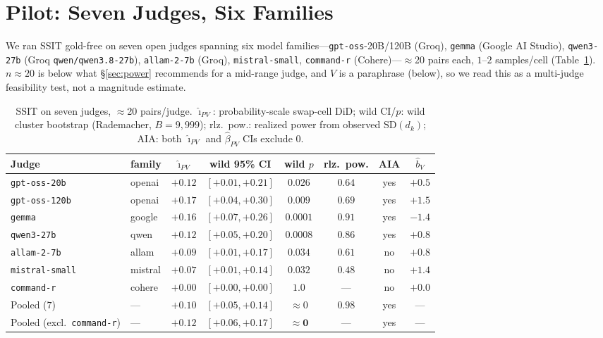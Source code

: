 \documentclass{article}
\begin{document}
\section{Pilot: Seven Judges, Six Families}
\label{sec:results}
\label{sec:pilot}

We ran SSIT gold-free on seven open judges spanning six model
families---\texttt{gpt-oss}-20B/120B (Groq), \texttt{gemma}
(Google AI Studio), \texttt{qwen3-27b} (Groq \texttt{qwen/qwen3.8-27b}),
\texttt{allam-2-7b} (Groq), \texttt{mistral-small}, \texttt{command-r}
(Cohere)---$\approx$20 pairs each, $1$--$2$ samples/cell
(Table~\ref{tab:pilot}). $n{\approx}20$ is below what \S\ref{sec:power}
recommends for a mid-range judge, and $V$ is a paraphrase (below), so
we read this as a multi-judge feasibility test, not a magnitude
estimate.

\begin{table}[htbp]
\centering
\caption{SSIT on seven judges, $\approx$20 pairs/judge.
$\hat\imath_{PV}$: probability-scale swap-cell DiD; wild CI/$p$:
wild cluster bootstrap (Rademacher, $B{=}9{,}999$); rlz.\ pow.:
realized power from observed $\mathrm{SD}(d_k)$; AIA: both
$\hat\imath_{PV}$ and $\hat\beta_{PV}$ CIs exclude 0.}
\label{tab:pilot}
\small
\begin{tabular}{llcccccc}
\toprule
Judge & family & $\hat\imath_{PV}$ & wild 95\% CI & wild $p$ & rlz.\ pow. & AIA & $\hat b_V$ \\
\midrule
\texttt{gpt-oss-20b}  & openai  & $+0.12$ & $[+0.01,+0.21]$ & $0.026$ & $0.64$ & yes & $+0.5$ \\
\texttt{gpt-oss-120b} & openai  & $+0.17$ & $[+0.04,+0.30]$ & $0.009$ & $0.69$ & yes & $+1.5$ \\
\texttt{gemma}        & google  & $+0.16$ & $[+0.07,+0.26]$ & $0.0001$ & $0.91$ & yes & $-1.4$ \\
\texttt{qwen3-27b}    & qwen    & $+0.12$ & $[+0.05,+0.20]$ & $0.0008$ & $0.86$ & yes & $+0.8$ \\
\texttt{allam-2-7b}   & allam   & $+0.09$ & $[+0.01,+0.17]$ & $0.034$ & $0.61$ & no  & $+0.8$ \\
\texttt{mistral-small}& mistral & $+0.07$ & $[+0.01,+0.14]$ & $0.032$ & $0.48$ & no  & $+1.4$ \\
\texttt{command-r}    & cohere  & $+0.00$ & $[+0.00,+0.00]$ & $1.0$   & ---    & no  & $+0.0$ \\
\midrule
Pooled ($7$)             & --- & $+0.10$ & $[+0.05,+0.14]$ & ${\approx}0$ & $0.98$ & yes & --- \\
Pooled (excl.\ \texttt{command-r}) & --- & $\mathbf{+0.12}$ & $\mathbf{[+0.06,+0.17]}$ & $\mathbf{{\approx}0}$ & --- & yes & --- \\
\bottomrule
\end{tabular}
\end{table}
\end{document}
